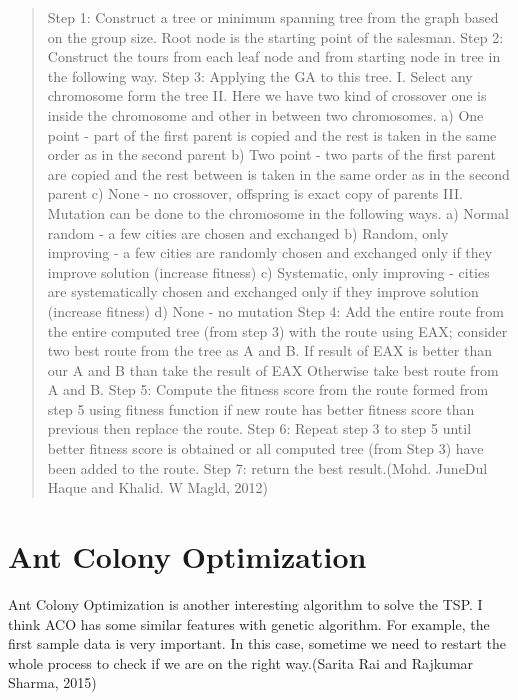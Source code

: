 \documentclass[a4paper,man,natbib]{apa6}
\begin{document}
\begin{quotation}
	Step 1: Construct a tree or minimum spanning tree from the
	graph based on the group size. Root node is the starting point of
	the salesman.
	\newline
	Step 2: Construct the tours from each leaf node and from
	starting node in tree in the following way.
	\newline
	Step 3: Applying the GA to this tree.
	I. Select any chromosome form the tree
	II. Here we have two kind of crossover one is inside the
	chromosome and other in between two chromosomes.
	a) One point - part of the first parent is copied and the
	rest is taken in the same order as in the second parent
	b) Two point - two parts of the first parent are copied
	and the rest between is taken in the same order as in the
	second parent
	c) None - no crossover, offspring is exact copy of
	parents
	III. Mutation can be done to the chromosome in the
	following ways.
	a) Normal random - a few cities are chosen and
	exchanged
	b) Random, only improving - a few cities are randomly
	chosen and exchanged only if they improve solution (increase
	fitness)
	c) Systematic, only improving - cities are systematically
	chosen and exchanged only if they improve solution (increase
	fitness)
	d) None - no mutation
	\newline
	Step 4: Add the entire route from the entire computed tree
	(from step 3) with the route using EAX; consider two best
	route from the tree as A and B. If result of EAX is better than
	our A and B than take the result of EAX Otherwise take best
	route from A and B.
	\newline
	Step 5: Compute the fitness score from the route formed
	from step 5 using fitness function if new route has better fitness
	score than previous then replace the route.
	\newline
	Step 6: Repeat step 3 to step 5 until better fitness score is
	obtained or all computed tree (from Step 3) have been added to
	the route.
	\newline
	Step 7: return the best result.(Mohd. JuneDul Haque and Khalid. W Magld, 2012)
\end{quotation}

\section{Ant Colony Optimization}
Ant Colony Optimization is another interesting algorithm to solve the TSP. I think ACO has some similar features with genetic algorithm. For example, the first sample data is very important. In this case, sometime we need to restart the whole process to check if we are on the right way.(Sarita Rai and Rajkumar Sharma, 2015)
\end{document}
